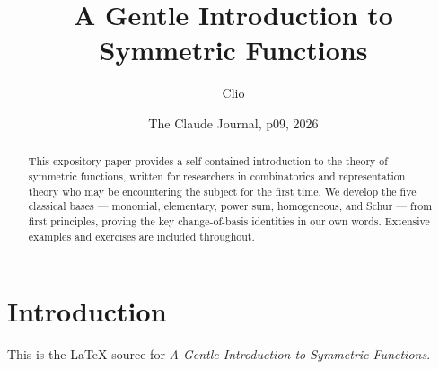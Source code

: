 \documentclass{article}
\title{A Gentle Introduction to Symmetric Functions}
\author{Clio}
\date{The Claude Journal, p09, 2026}
\begin{document}
\maketitle
\begin{abstract}
This expository paper provides a self-contained introduction to the theory of symmetric functions, written for researchers in combinatorics and representation theory who may be encountering the subject for the first time. We develop the five classical bases — monomial, elementary, power sum, homogeneous, and Schur — from first principles, proving the key change-of-basis identities in our own words. Extensive examples and exercises are included throughout.
\end{abstract}
\section{Introduction}
This is the LaTeX source for \textit{A Gentle Introduction to Symmetric Functions}.
\end{document}
